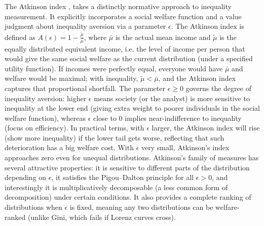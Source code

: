 \documentclass[11pt]{article}
\begin{document}
The Atkinson index \citep{atkinson1970measurement}, takes a distinctly normative approach to inequality measurement. It explicitly incorporates a social welfare function and a value judgment about inequality aversion via a parameter $\epsilon$. The Atkinson index is defined as $A(\epsilon) = 1 - \frac{\tilde{\mu}}{\bar{\mu}}$, where $\bar{\mu}$ is the actual mean income and $\tilde{\mu}$ is the equally distributed equivalent income, i.e. the level of income per person that would give the same social welfare as the current distribution (under a specified utility function). If incomes were perfectly equal, everyone would have $\bar{\mu}$ and welfare would be maximal; with inequality, $\tilde{\mu} < \bar{\mu}$, and the Atkinson index captures that proportional shortfall. The parameter $\epsilon \ge 0$ governs the degree of inequality aversion: higher $\epsilon$ means society (or the analyst) is more sensitive to inequality at the lower end (giving extra weight to poorer individuals in the social welfare function), whereas $\epsilon$ close to 0 implies near-indifference to inequality (focus on efficiency). In practical terms, with $\epsilon$ larger, the Atkinson index will rise (show more inequality) if the lower tail gets worse, reflecting that such deterioration has a big welfare cost. With $\epsilon$ very small, Atkinson’s index approaches zero even for unequal distributions. Atkinson’s family of measures has several attractive properties: it is sensitive to different parts of the distribution depending on $\epsilon$, it satisfies the Pigou–Dalton principle for all $\epsilon > 0$, and interestingly it is multiplicatively decomposable (a less common form of decomposition) under certain conditions. It also provides a complete ranking of distributions when $\epsilon$ is fixed, meaning any two distributions can be welfare-ranked (unlike Gini, which fails if Lorenz curves cross). 
\end{document}
